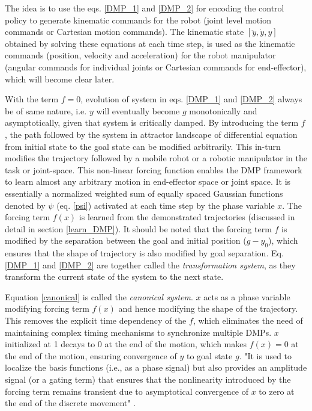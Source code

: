 The idea is to use the eqs. \ref{DMP_1} and \ref{DMP_2} for encoding the control policy to generate kinematic commands for the robot (joint level motion commands or Cartesian motion commands). The kinematic state $[\ddot{y}, \dot{y}, y]$ obtained by solving these equations at each time step, is used as the kinematic commands (position, velocity and acceleration) for the robot manipulator (angular commands for individual joints or Cartesian commands for end-effector), which will become clear later.

With the term $f=0$, evolution of system in eqs. \ref{DMP_1} and \ref{DMP_2} always be of same nature, i.e. $y$ will eventually become $g$ monotonically and asymptotically, given that system is critically damped. By introducing the term $f$, the path followed by the system in attractor landscape of differential equation from initial state to the goal state can be modified arbitrarily. This in-turn modifies the trajectory followed by a mobile robot or a robotic manipulator in the task or joint-space. This non-linear forcing function enables the DMP framework to learn almost any arbitrary motion in end-effector space or joint space. It is essentially a normalized weighted sum of equally spaced Gaussian functions denoted by $\psi$ (eq. \ref{psi}) activated at each time step by the phase variable $x$. The forcing term $f(x)$ is learned from the demonstrated trajectories (discussed in detail in section \ref{learn_DMP}). It should be noted that the forcing term $f$ is modified by the separation between the goal and initial position ($g - y_{0}$), which ensures that the shape of trajectory is also modified by goal separation. Eq. \ref{DMP_1} and \ref{DMP_2} are together called the \textit{transformation system}, as they transform the current state of the system to the next state.   

Equation \ref{canonical} is called the \textit{canonical system}. $x$ acts as a phase variable modifying forcing term $f(x)$ and hence modifying the shape of the trajectory. This removes the explicit time dependency of the $f$, which eliminates the need of maintaining complex timing mechanisms to synchronize multiple DMPs. $x$ initialized at 1 decays to 0 at the end of the motion, which makes $f(x) = 0$ at the end of the motion, ensuring convergence of $y$ to goal state $g$. "It is used to localize the basis functions (i.e., as a phase signal) but also provides an amplitude signal (or a gating term) that ensures that the nonlinearity introduced by the forcing term remains transient due to asymptotical convergence of $x$ to zero at the end of the discrete movement" \cite{ijspeert2013dynamical}.

